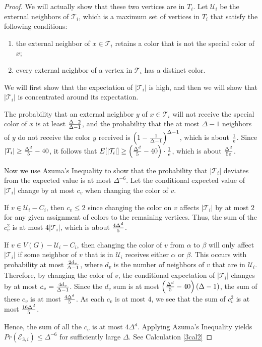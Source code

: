 \documentclass[12pt]{article}
\theoremstyle{definition}
\begin{document}
\begin{proof}
We will actually show that these two vertices are in $T_i$. 
Let $\mathcal{U}_i$ be the external neighbors of $\mathcal{T}_i$, which is a maximum set of vertices in $T_i$ that satisfy the following conditions:
\begin{enumerate}[$(i)$]
\item the external neighbor of $x\in\mathcal{T}_i$ retains a color that is not the special color of $x$;
\item every external neighbor of a vertex in $\mathcal{T}_i$ has a distinct color. 
\end{enumerate} 
We will first show that the expectation of $|\mathcal{T}_i|$ is high, and then we will show that $|\mathcal{T}_i|$ is concentrated around its expectation. 

The probability that an external neighbor $y$ of $x\in\mathcal{T}_i$ will not receive the special color of $x$ is at least ${\Delta-2\over \Delta-1}$, and the probability that the at most $\Delta-1$ neighbors of $y$ do not receive the color $y$ received is $\left(1-{1\over \Delta-1}\right)^{\Delta-1}$, which is about $1\over e$. 
Since $|{T}_i|\geq {\Delta^d\over 5}-40$, it follows that $E[|\mathcal{T}_i|]\geq \left({\Delta^d\over 5}-40\right)\cdot{1\over e}$, which is about ${\Delta^d\over 5e}$.

Now we use Azuma's Inequality to show that the probability that $|\mathcal{T}_i|$ deviates from the expected value is at most $\Delta^{-6}$. 
Let the conditional expected value of $|\mathcal{T}_i|$ change by at most $c_v$ when changing the color of $v$. 

If $v\in \mathcal{U}_i-C_i$, then $c_v\leq 2$ since changing the color on $v$ affects $|\mathcal{T}_i|$ by at most $2$ for any given assignment of colors to the remaining vertices.
Thus, the sum of the $c_v^2$ is at most $4|\mathcal{T}_i|$, which is about ${4\Delta^d\over 5}$. 

If $v\in V(G)-\mathcal{U}_i-C_i$, then changing the color of $v$ from $\alpha$ to $\beta$ will only affect $|\mathcal{T}_i|$ if some neighbor of $v$ that is in $\mathcal{U}_i$ receives either $\alpha$ or $\beta$. 
This occurs with probability at most ${2d_v\over \Delta-1}$, where $d_v$ is the number of neighbors of $v$ that are in $\mathcal{U}_i$. 
Therefore, by changing the color of $v$, the conditional expectation of $|\mathcal{T}_i|$ changes by at most $c_v={4d_v\over \Delta-1}$. 
Since the $d_v$ sum is at most $\left({\Delta^d\over 5}-40\right)(\Delta-1)$, the sum of these $c_v$ is at most ${4\Delta^d\over 5}$. As each $c_v$ is at most $4$, we see that the sum of $c_v^2$ is at most ${16\Delta^d\over 5}$.

Hence, the sum of all the $c_v$ is at most $4\Delta^d$. Applying Azuma's Inequality yields $Pr(\mathcal{E}_{3, i})\leq \Delta^{-6}$ for sufficiently large $\Delta$. See Calculation \ref{3cal2}
\end{proof}
\end{document}
